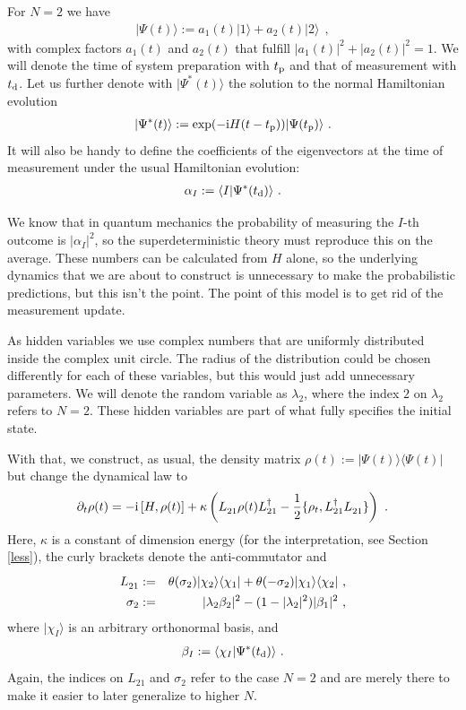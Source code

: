 \documentclass[12pt]{article}
\def\beqn{\begin{eqnarray}}
\def\eeqn{\end{eqnarray}}
\begin{document}
For $N =2$ we have
\beqn
|\Psi (t) \rangle := a_1(t) | 1 \rangle + a_2 (t) | 2 \rangle ~~,
\eeqn
with complex factors $a_1(t)$ and $a_2(t)$ that fulfill $ |a_1(t)|^2 + |a_2(t)|^2 = 1$. We will denote the time of
system preparation with $t_{\rm p}$ and that of measurement with $t_{\rm d}$. %
Let us further denote with $|\Psi ^* (t) \rangle$ the solution to the normal Hamiltonian evolution
\beqn
|\Psi^* (t) \rangle := \exp ( - {\rm i}  H (t -t_{\rm p}) ) |\Psi (t_{\rm p}) \rangle ~.
\eeqn
It will also be handy to define the coefficients of the eigenvectors at the time of measurement under the
usual Hamiltonian evolution:
\beqn 
\alpha_I := \langle I | \Psi^* (t_{\rm d}) \rangle~.
\eeqn

We know that in quantum mechanics the probability of measuring the $I$-th outcome is $|\alpha_I |^2$, so the
superdeterministic theory must reproduce this on the average. These numbers can be calculated from $ H$
alone, so the underlying dynamics that we are about to construct is unnecessary to make the probabilistic predictions, but this isn't the point. The point of this model is to get rid of the measurement update. 


As hidden variables we use complex numbers that are
uniformly distributed inside the complex unit circle. The radius of the distribution could be chosen differently for each of these variables, but this would just add
unnecessary parameters. We will denote the random variable as $\lambda_2$, where the
index $2$ on $\lambda_2$ refers to $N=2$. These hidden variables are part of what fully specifies the initial state. 

With that, we construct, as usual, the density matrix $\rho(t) := |\Psi(t) \rangle \langle \Psi(t) |$ but change the dynamical law to 
\beqn
\partial_t \rho(t) = - {\rm i} \left[  H, \rho(t) \right] +  \kappa \left( L^{\textcolor{white}{\dag}}_{21} \rho(t) L_{21}^\dag - \frac{1}{2} \{ 
\rho_t, L^\dag_{21} L_{21}^{\textcolor{white}{\dag}} \} \right)~. \label{dyn}
\eeqn
Here, $\kappa$ is a constant of dimension energy (for the interpretation, see Section \ref{less}), the curly brackets denote the anti-commutator and
\beqn
L^{\textcolor{white}{\dag}}_{21} &:=& \theta(\sigma_2)  |\chi_2 \rangle \langle \chi_1| + \theta(-\sigma_2)  |\chi_1 \rangle \langle \chi_2| ~, \\
\sigma_2 &:=&  |  \lambda_2 \beta_2 |^2 - (1 -  | \lambda_2|^2) |\beta_1|^2 ~,
\eeqn
where $| \chi_I \rangle$ is an arbitrary orthonormal basis, and 
\beqn 
\beta_I := \langle \chi_I | \Psi^* (t_{\rm d}) \rangle~.
\eeqn
Again, the indices on $L_{21}$ and $\sigma_2$ refer to the case $N=2$ and are merely there to make it easier to later
generalize to higher $N$. 
\end{document}
